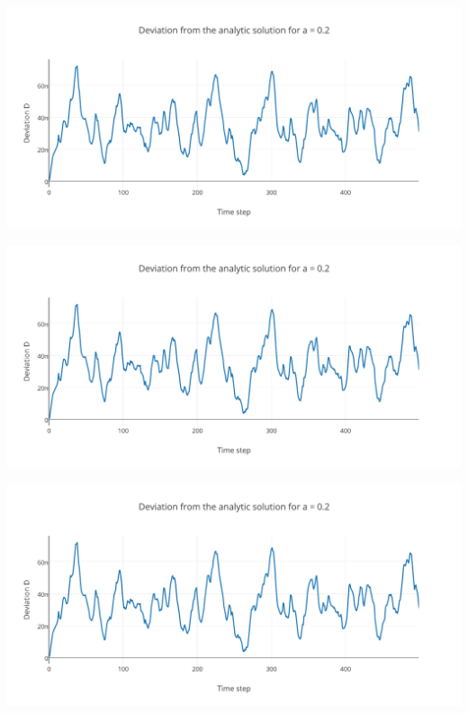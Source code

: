 \begin{Figure}
    \centering
    \includegraphics[width=\linewidth]{distancea10.pdf}
    \label{fig:distancea10}
\end{Figure}


\begin{Figure}
    \centering
    \includegraphics[width=\linewidth]{distancea10.pdf}
    \label{fig:distancea05}
\end{Figure}


\begin{Figure}
    \centering
    \includegraphics[width=\linewidth]{distancea10.pdf}
    \label{fig:distancea02}
\end{Figure}

